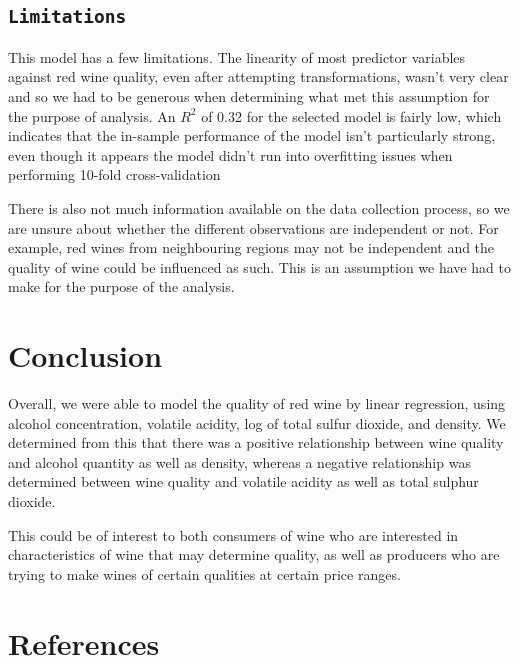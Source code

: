 \documentclass[letterpaper,8pt,twocolumn,twoside,]{pinp}
\begin{document}
\hypertarget{limitations}{%
\subsection{\texorpdfstring{\texttt{Limitations}}{Limitations}}\label{limitations}}

This model has a few limitations. The linearity of most predictor
variables against red wine quality, even after attempting
transformations, wasn't very clear and so we had to be generous when
determining what met this assumption for the purpose of analysis. An
\(R^2\) of 0.32 for the selected model is fairly low, which indicates
that the in-sample performance of the model isn't particularly strong,
even though it appears the model didn't run into overfitting issues when
performing 10-fold cross-validation

There is also not much information available on the data collection
process, so we are unsure about whether the different observations are
independent or not. For example, red wines from neighbouring regions may
not be independent and the quality of wine could be influenced as such.
This is an assumption we have had to make for the purpose of the
analysis.

\hypertarget{conclusion}{%
\section{Conclusion}\label{conclusion}}

Overall, we were able to model the quality of red wine by linear
regression, using alcohol concentration, volatile acidity, log of total
sulfur dioxide, and density. We determined from this that there was a
positive relationship between wine quality and alcohol quantity as well
as density, whereas a negative relationship was determined between wine
quality and volatile acidity as well as total sulphur dioxide.

This could be of interest to both consumers of wine who are interested
in characteristics of wine that may determine quality, as well as
producers who are trying to make wines of certain qualities at certain
price ranges.

\hypertarget{references}{%
\section{References}\label{references}}

\showacknow
\end{document}
